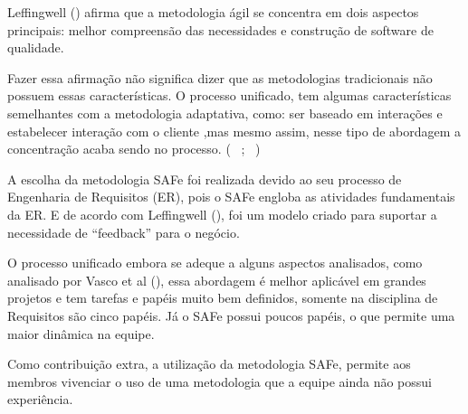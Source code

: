 Leffingwell (\citeyear{safe}) afirma que a metodologia ágil se concentra em dois aspectos principais: 
melhor compreensão das necessidades e construção de software de qualidade. 

Fazer essa afirmação não significa dizer que as metodologias tradicionais não possuem essas características. O processo unificado, 
tem algumas características semelhantes com a metodologia adaptativa, como: ser baseado em interações e estabelecer interação com o cliente
,mas mesmo assim, nesse tipo de abordagem a concentração acaba sendo no processo. (~\cite{safe} ; ~\cite{vasco})

A escolha da metodologia SAFe foi realizada devido ao seu processo de Engenharia de Requisitos (ER), pois o SAFe engloba as atividades
fundamentais da ER. E de acordo com Leffingwell (\citeyear{safe}), foi um modelo criado para suportar a necessidade de ``feedback''
para o negócio. 

O processo unificado embora se adeque a alguns aspectos analisados, como analisado por Vasco et al (\citeyear{vasco}),
essa abordagem é melhor  aplicável em grandes projetos e tem tarefas e papéis muito bem definidos, somente na 
disciplina de Requisitos são cinco papéis. Já o SAFe possui poucos papéis, o que permite uma maior 
dinâmica na equipe.

Como contribuição extra, a utilização da metodologia SAFe, permite aos membros vivenciar
o uso de uma metodologia que a equipe ainda não possui experiência.
